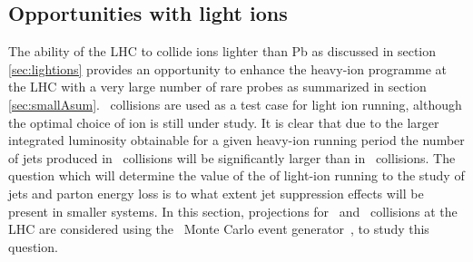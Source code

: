 
\subsection{Opportunities with light ions}
\label{sec:jetslightions}

The ability of the LHC to collide ions lighter than Pb as discussed in section \ref{sec:lightions} provides an opportunity to enhance the heavy-ion programme at the LHC with a very large number of rare probes as summarized in section \ref{sec:smallAsum}.  \ArAr\ collisions are used as a test case for light ion running, although the optimal choice of ion is still under study. It is clear that due to the larger integrated luminosity obtainable for a given heavy-ion running period the number of jets produced in \ArAr\ collisions will be significantly larger than in \PbPb\ collisions.  The question which will determine the value of the of light-ion running to the study of jets and parton energy loss is to what extent jet suppression effects will be present in smaller systems.  In this section, projections for \ArAr\ and \XeXe\ collisions at the LHC are considered using the \jewel\ Monte Carlo event generator~\cite{Zapp:2013vla}, to study this question.  

